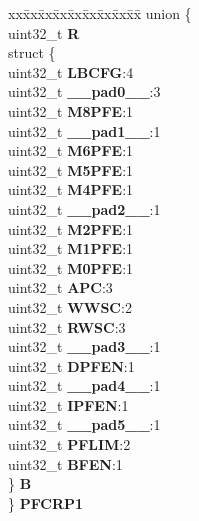 \begin{DoxyCompactItemize}
\begin{tabbing}
\end{tabbing}\item 
\mbox{\label{structFLASH__tag_a7839224c9ba6bc562e6cc1dc67427fd6}} 
\begin{tabbing}
xx\=xx\=xx\=xx\=xx\=xx\=xx\=xx\=xx\=\kill
union \{\\
\>uint32\_t {\bfseries R}\\
\>struct \{\\
\>\>uint32\_t {\bfseries LBCFG}:4\\
\>\>uint32\_t {\bfseries \_\_pad0\_\_}:3\\
\>\>uint32\_t {\bfseries M8PFE}:1\\
\>\>uint32\_t {\bfseries \_\_pad1\_\_}:1\\
\>\>uint32\_t {\bfseries M6PFE}:1\\
\>\>uint32\_t {\bfseries M5PFE}:1\\
\>\>uint32\_t {\bfseries M4PFE}:1\\
\>\>uint32\_t {\bfseries \_\_pad2\_\_}:1\\
\>\>uint32\_t {\bfseries M2PFE}:1\\
\>\>uint32\_t {\bfseries M1PFE}:1\\
\>\>uint32\_t {\bfseries M0PFE}:1\\
\>\>uint32\_t {\bfseries APC}:3\\
\>\>uint32\_t {\bfseries WWSC}:2\\
\>\>uint32\_t {\bfseries RWSC}:3\\
\>\>uint32\_t {\bfseries \_\_pad3\_\_}:1\\
\>\>uint32\_t {\bfseries DPFEN}:1\\
\>\>uint32\_t {\bfseries \_\_pad4\_\_}:1\\
\>\>uint32\_t {\bfseries IPFEN}:1\\
\>\>uint32\_t {\bfseries \_\_pad5\_\_}:1\\
\>\>uint32\_t {\bfseries PFLIM}:2\\
\>\>uint32\_t {\bfseries BFEN}:1\\
\>\} {\bfseries B}\\
\} {\bfseries PFCRP1}\\


\end{tabbing}
\end{DoxyCompactItemize}
